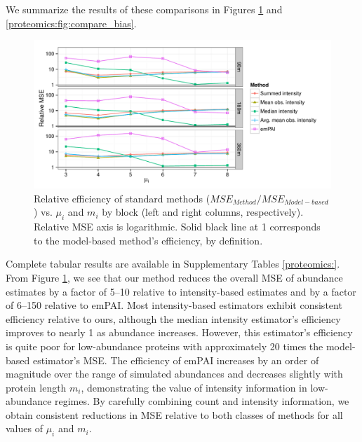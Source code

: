 We summarize the results of these comparisons in Figures \ref{proteomics:fig:compare_relative_error} and \ref{proteomics:fig:compare_bias}.
%
\begin{figure}
\centering
\includegraphics[width=\textwidth, page=3]{figures/proteomics/figures_relative_error_sim}
\caption{Relative efficiency of standard methods ($MSE_{Method} / MSE_{Model-based}$) vs. $\mu_i$ and $m_i$ by block (left and right columns, respectively). Relative MSE axis is logarithmic. Solid black line at 1 corresponds to the model-based method's efficiency, by definition.
\label{proteomics:fig:compare_relative_error}}
\end{figure}
%
Complete tabular results are available in Supplementary Tables \ref{proteomics:}.
From Figure \ref{proteomics:fig:compare_relative_error}, we see that our method reduces the overall MSE of abundance estimates by a factor of 5--10 relative to intensity-based estimates and by a factor of 6--150 relative to emPAI.
Most intensity-based estimators exhibit consistent efficiency relative to ours, although the median intensity estimator's efficiency improves to nearly 1 as abundance increases.
However, this estimator's efficiency is quite poor for low-abundance proteins with approximately 20 times the model-based estimator's MSE.
The efficiency of emPAI increases by an order of magnitude over the range of simulated abundances and decreases slightly with protein length $m_i$, demonstrating the value of intensity information in low-abundance regimes.
By carefully combining count and intensity information, we obtain consistent reductions in MSE relative to both classes of methods for all values of $\mu_i$ and $m_i$.

